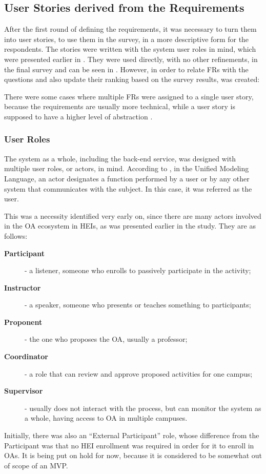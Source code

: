 \subsection{User Stories derived from the Requirements}\label{ext:user-stories}

After the first round of defining the requirements, it was necessary to turn them into user stories, to use them in the survey, in a more descriptive form for the respondents. The stories were written with the system user roles in mind, which were presented earlier in . They were used directly, with no other refinements, in the final survey and can be seen in . However, in order to relate \acp{FR} with the questions and also update their ranking based on the survey results,  was created:



There were some cases where multiple \acp{FR} were assigned to a single user story, because the requirements are usually more technical, while a user story is supposed to have a higher level of abstraction \cite{DIMITRIJEVIC2015352}.

\subsubsection{User Roles}\label{ext:user-roles}

The system as a whole, including the back-end service, was designed with multiple user roles, or actors, in mind. According to \textcite{omg_2017}, in the Unified Modeling Language, an actor designates a function performed by a user or by any other system that communicates with the subject. In this case, it was referred as the user.

This was a necessity identified very early on, since there are many actors involved in the \ac{OA} ecosystem in \acp{HEI}, as was presented earlier in the study. They are as follows:
\begin{description}
  \item[\textbf{Participant}] - a listener, someone who enrolls to passively participate in the activity;
  \item[\textbf{Instructor}] - a speaker, someone who presents or teaches something to participants;
  \item[\textbf{Proponent}] - the one who proposes the \ac{OA}, usually a professor;
  \item[\textbf{Coordinator}] - a role that can review and approve proposed activities for one campus;
  \item[\textbf{Supervisor}] - usually does not interact with the process, but can monitor the system as a whole, having access to \ac{OA} in multiple campuses.
\end{description}
Initially, there was also an ``External Participant'' role, whose difference from the Participant was that no \ac{HEI} enrollment was required in order for it to enroll in \acp{OA}. It is being put on hold for now, because it is considered to be somewhat out of scope of an \ac{MVP}.

